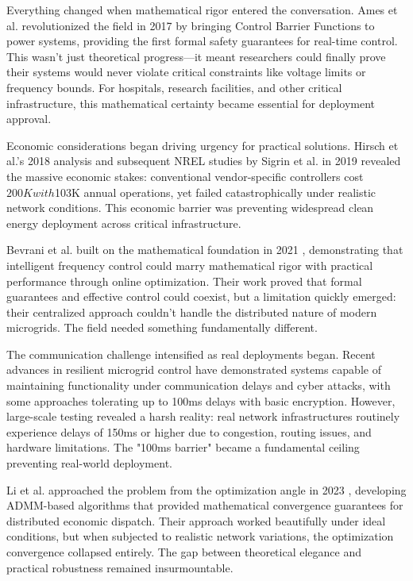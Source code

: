 \documentclass[12pt]{article}
\begin{document}
Everything changed when mathematical rigor entered the conversation. Ames et al. revolutionized the field in 2017 \cite{ames2017} by bringing Control Barrier Functions to power systems, providing the first formal safety guarantees for real-time control. This wasn't just theoretical progress—it meant researchers could finally prove their systems would never violate critical constraints like voltage limits or frequency bounds. For hospitals, research facilities, and other critical infrastructure, this mathematical certainty became essential for deployment approval.

Economic considerations began driving urgency for practical solutions. Hirsch et al.'s 2018 analysis \cite{hirsch2018} and subsequent NREL studies by Sigrin et al. in 2019 \cite{sigrin2019} revealed the massive economic stakes: conventional vendor-specific controllers cost $200K with $103K annual operations, yet failed catastrophically under realistic network conditions. This economic barrier was preventing widespread clean energy deployment across critical infrastructure.

Bevrani et al. built on the mathematical foundation in 2021 \cite{bevrani2021}, demonstrating that intelligent frequency control could marry mathematical rigor with practical performance through online optimization. Their work proved that formal guarantees and effective control could coexist, but a limitation quickly emerged: their centralized approach couldn't handle the distributed nature of modern microgrids. The field needed something fundamentally different.

The communication challenge intensified as real deployments began. Recent advances in resilient microgrid control have demonstrated systems capable of maintaining functionality under communication delays and cyber attacks, with some approaches tolerating up to 100ms delays with basic encryption. However, large-scale testing revealed a harsh reality: real network infrastructures routinely experience delays of 150ms or higher due to congestion, routing issues, and hardware limitations. The "100ms barrier" became a fundamental ceiling preventing real-world deployment.

Li et al. approached the problem from the optimization angle in 2023 \cite{li2023}, developing ADMM-based algorithms that provided mathematical convergence guarantees for distributed economic dispatch. Their approach worked beautifully under ideal conditions, but when subjected to realistic network variations, the optimization convergence collapsed entirely. The gap between theoretical elegance and practical robustness remained insurmountable.
\end{document}

